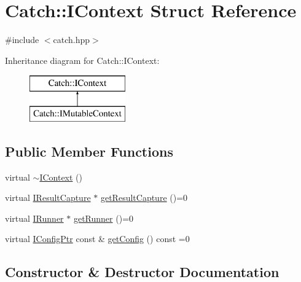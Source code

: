 \hypertarget{struct_catch_1_1_i_context}{}\section{Catch\+:\+:I\+Context Struct Reference}
\label{struct_catch_1_1_i_context}


{\ttfamily \#include $<$catch.\+hpp$>$}

Inheritance diagram for Catch\+:\+:I\+Context\+:\begin{figure}[H]
\begin{center}
\leavevmode
\includegraphics[height=2.000000cm]{struct_catch_1_1_i_context}
\end{center}
\end{figure}
\subsection*{Public Member Functions}
\begin{DoxyCompactItemize}
\item 
virtual \mbox{\hyperlink{struct_catch_1_1_i_context_aeb17355c1be6c2ced5407cad7202628d}{$\sim$\+I\+Context}} ()
\item 
virtual \mbox{\hyperlink{struct_catch_1_1_i_result_capture}{I\+Result\+Capture}} $\ast$ \mbox{\hyperlink{struct_catch_1_1_i_context_a684e4ae71d1fdf3060c352ecde1d122f}{get\+Result\+Capture}} ()=0
\item 
virtual \mbox{\hyperlink{struct_catch_1_1_i_runner}{I\+Runner}} $\ast$ \mbox{\hyperlink{struct_catch_1_1_i_context_af088415dde18d039ed5a2f95b02767c6}{get\+Runner}} ()=0
\item 
virtual \mbox{\hyperlink{namespace_catch_afd20a5d4f9d2f4d525db81a7765367b0}{I\+Config\+Ptr}} const  \& \mbox{\hyperlink{struct_catch_1_1_i_context_a72a2718232adea8925fec9e71d3efd75}{get\+Config}} () const =0
\end{DoxyCompactItemize}


\subsection{Constructor \& Destructor Documentation}
\mbox{\label{struct_catch_1_1_i_context_aeb17355c1be6c2ced5407cad7202628d}} 
